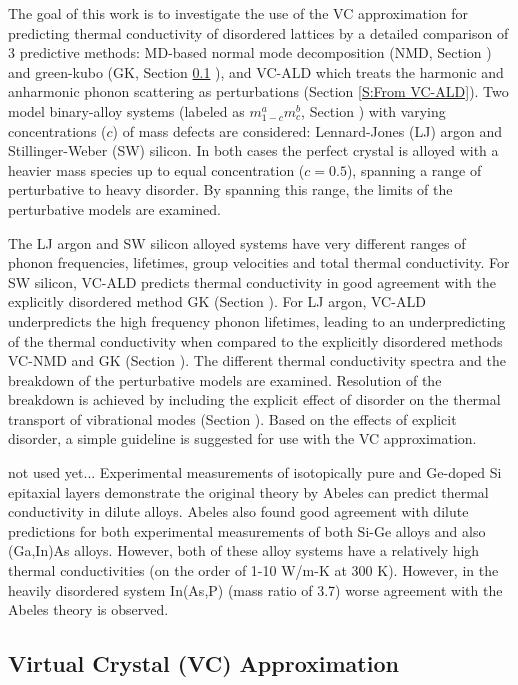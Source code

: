 \documentclass[aps,prb,onecolumn,preprint,superscriptaddress,amsmath,amssymb,floatfix]{revtex4}
\begin{document}
The goal of this work is to investigate the use of the VC 
approximation for predicting thermal conductivity of disordered 
lattices by a detailed comparison 
of 3 predictive methods: MD-based normal mode 
decomposition (NMD, Section ) and green-kubo (GK, Section \ref{} ), 
and VC-ALD which treats the harmonic and 
anharmonic phonon scattering as perturbations 
(Section \ref{S:From VC-ALD}).  
Two model binary-alloy systems 
(labeled as $m^a_{1-c}m^b_{c}$, Section ) 
with varying concentrations ($c$) of mass defects  
are considered: 
Lennard-Jones (LJ) argon and Stillinger-Weber (SW) silicon. 
In both cases the perfect crystal is 
alloyed with a heavier mass species up to equal 
concentration ($c=0.5$), spanning 
a range of perturbative to heavy disorder. By spanning this range, 
the limits of the perturbative models are examined.

The LJ argon and SW silicon alloyed 
systems have very different ranges of phonon frequencies, 
lifetimes, group velocities and total thermal conductivity. 
For SW silicon, 
VC-ALD predicts thermal conductivity in good agreement with the 
explicitly disordered method GK (Section ). 
For LJ argon, VC-ALD underpredicts 
the high frequency phonon lifetimes, leading to an underpredicting of 
the thermal conductivity when compared to the explicitly disordered 
methods VC-NMD and GK (Section ). 
The different thermal conductivity spectra  
and the breakdown of the perturbative models are examined. Resolution 
of the breakdown is achieved by including the explicit effect of
disorder on the thermal transport of vibrational modes (Section ). Based 
on the effects of explicit disorder, a simple guideline is suggested 
for use with the VC approximation.

not used yet...
Experimental measurements of isotopically pure and Ge-doped 
Si epitaxial layers demonstrate the original theory by Abeles can predict 
thermal conductivity in dilute alloys. Abeles also found good agreement 
with dilute predictions for both experimental measurements of both 
Si-Ge alloys and also (Ga,In)As alloys.\cite{abeles_lattice_1963} However, 
both of these alloy systems have a relatively high thermal conductivities 
(on the order of 1-10 W/m-K at 300 K). However, in the heavily disordered 
system In(As,P) (mass ratio of 3.7) worse agreement with the Abeles theory 
is observed. 

\subsection{\label{S:Virtual Crystal}Virtual Crystal (VC) Approximation}
\end{document}
